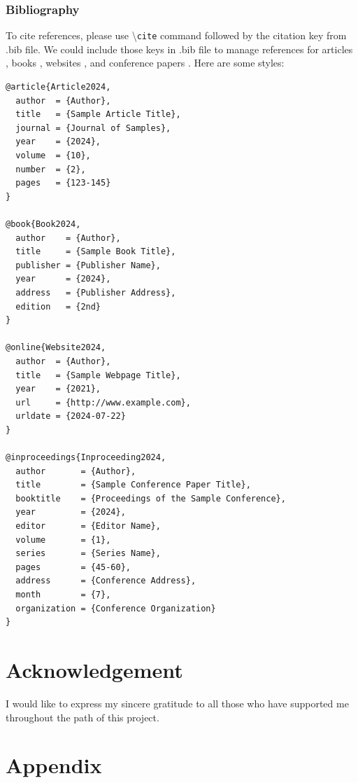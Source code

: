\subsubsection{Bibliography}
To cite references, please use \textbackslash \texttt{cite} command followed by the citation key from .bib file. We could include those keys in .bib file to manage references for articles \cite{Article2024}, books \cite{Book2024}, websites \cite{Website2024}, and conference papers \cite{Inproceeding2024}. Here are some styles:

\begin{lstlisting}
@article{Article2024,
  author  = {Author},
  title   = {Sample Article Title},
  journal = {Journal of Samples},
  year    = {2024},
  volume  = {10},
  number  = {2},
  pages   = {123-145}
}

@book{Book2024,
  author    = {Author},
  title     = {Sample Book Title},
  publisher = {Publisher Name},
  year      = {2024},
  address   = {Publisher Address},
  edition   = {2nd}
}

@online{Website2024,
  author  = {Author},
  title   = {Sample Webpage Title},
  year    = {2021},
  url     = {http://www.example.com},
  urldate = {2024-07-22}
}

@inproceedings{Inproceeding2024,
  author       = {Author},
  title        = {Sample Conference Paper Title},
  booktitle    = {Proceedings of the Sample Conference},
  year         = {2024},
  editor       = {Editor Name},
  volume       = {1},
  series       = {Series Name},
  pages        = {45-60},
  address      = {Conference Address},
  month        = {7},
  organization = {Conference Organization}
}
\end{lstlisting}


\section{Acknowledgement}
I would like to express my sincere gratitude to all those who have supported me throughout the path of this project.


\printbibliography[title={References}]


\newpage
\appendix
\section*{Appendix}
\setcounter{equation}{0}
\renewcommand{\theequation}{A.\arabic{equation}} 

